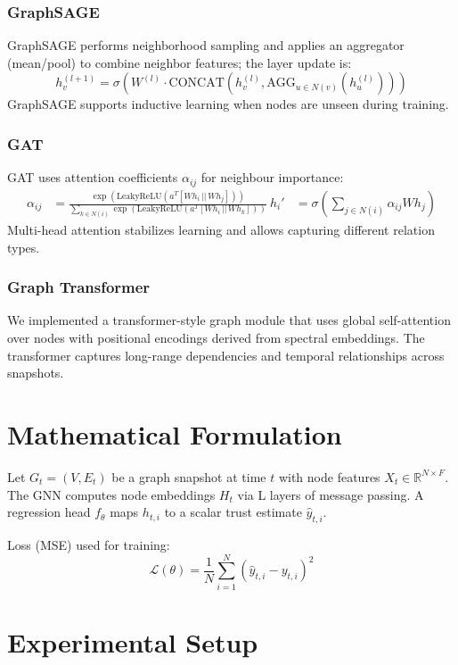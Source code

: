 \documentclass[12pt,a4paper]{article}
\begin{document}
\subsubsection{GraphSAGE}
GraphSAGE performs neighborhood sampling and applies an aggregator (mean/pool) to combine neighbor features; the layer update is:
\begin{equation}
h_v^{(l+1)} = \sigma\left(W^{(l)} \cdot \text{CONCAT}(h_v^{(l)}, \text{AGG}_{u\in N(v)}(h_u^{(l)}))\right)
\end{equation}
GraphSAGE supports inductive learning when nodes are unseen during training.

\subsubsection{GAT}
GAT uses attention coefficients $\alpha_{ij}$ for neighbour importance:
\begin{align}
\alpha_{ij} &= \frac{\exp(\text{LeakyReLU}(a^T[Wh_i\,||\,Wh_j]))}{\sum_{k\in N(i)} \exp(\text{LeakyReLU}(a^T[Wh_i\,||\,Wh_k]))} \
h_i' &= \sigma\left(\sum_{j\in N(i)} \alpha_{ij} Wh_j\right)
\end{align}
Multi-head attention stabilizes learning and allows capturing different relation types.

\subsubsection{Graph Transformer}
We implemented a transformer-style graph module that uses global self-attention over nodes with positional encodings derived from spectral embeddings. The transformer captures long-range dependencies and temporal relationships across snapshots.

\section{Mathematical Formulation}
Let $G_t=(V,E_t)$ be a graph snapshot at time $t$ with node features $X_t\in\mathbb{R}^{N\times F}$. The GNN computes node embeddings $H_t$ via L layers of message passing. A regression head $f_\theta$ maps $h_{t,i}$ to a scalar trust estimate $\hat{y}_{t,i}$.

Loss (MSE) used for training:
\begin{equation}
\mathcal{L}(\theta) = \frac{1}{N}\sum_{i=1}^N (\hat{y}_{t,i} - y_{t,i})^2
\end{equation}

\section{Experimental Setup}
\end{document}
